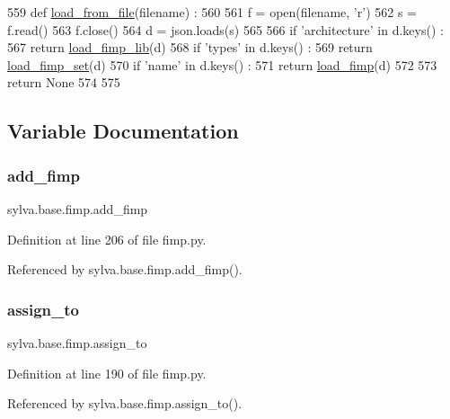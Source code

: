 \begin{DoxyCode}
559 \textcolor{keyword}{def }\hyperlink{namespacesylva_1_1base_1_1fimp_ae9ea3885312a946a5a94bd8b2eef9b95}{load\_from\_file}(filename) :
560 
561   f = open(filename, \textcolor{stringliteral}{'r')}
562 \textcolor{stringliteral}{  s = f.read()}
563 \textcolor{stringliteral}{  f.close()}
564 \textcolor{stringliteral}{  d = json.loads(s)}
565 \textcolor{stringliteral}{}
566 \textcolor{stringliteral}{  }\textcolor{keywordflow}{if} \textcolor{stringliteral}{'architecture'} \textcolor{keywordflow}{in} d.keys() :
567     \textcolor{keywordflow}{return} \hyperlink{namespacesylva_1_1base_1_1fimp_a57a8b55e554c3c8977bdca59b12fde4f}{load\_fimp\_lib}(d)
568   \textcolor{keywordflow}{if} \textcolor{stringliteral}{'types'} \textcolor{keywordflow}{in} d.keys() :
569     \textcolor{keywordflow}{return} \hyperlink{namespacesylva_1_1base_1_1fimp_ad713bc31de8ee05df0c1184daba1ffb8}{load\_fimp\_set}(d)
570   \textcolor{keywordflow}{if} \textcolor{stringliteral}{'name'} \textcolor{keywordflow}{in} d.keys() :
571     \textcolor{keywordflow}{return} \hyperlink{namespacesylva_1_1base_1_1fimp_a49222336c8f368ae3381e7b8b456a8b4}{load\_fimp}(d)
572 
573   \textcolor{keywordflow}{return} \textcolor{keywordtype}{None}
574 
575 \end{DoxyCode}


\subsection{Variable Documentation}
\mbox{\label{namespacesylva_1_1base_1_1fimp_a82bf900d1f19a23480ce25d4055fa3d3}} 
\subsubsection{\texorpdfstring{add\+\_\+fimp}{add\_fimp}}
{\footnotesize\ttfamily sylva.\+base.\+fimp.\+add\+\_\+fimp}



Definition at line 206 of file fimp.\+py.



Referenced by sylva.\+base.\+fimp.\+add\+\_\+fimp().

\mbox{\label{namespacesylva_1_1base_1_1fimp_aa034443ad56b50c50310f6cc6753e52b}} 
\subsubsection{\texorpdfstring{assign\+\_\+to}{assign\_to}}
{\footnotesize\ttfamily sylva.\+base.\+fimp.\+assign\+\_\+to}



Definition at line 190 of file fimp.\+py.



Referenced by sylva.\+base.\+fimp.\+assign\+\_\+to().

